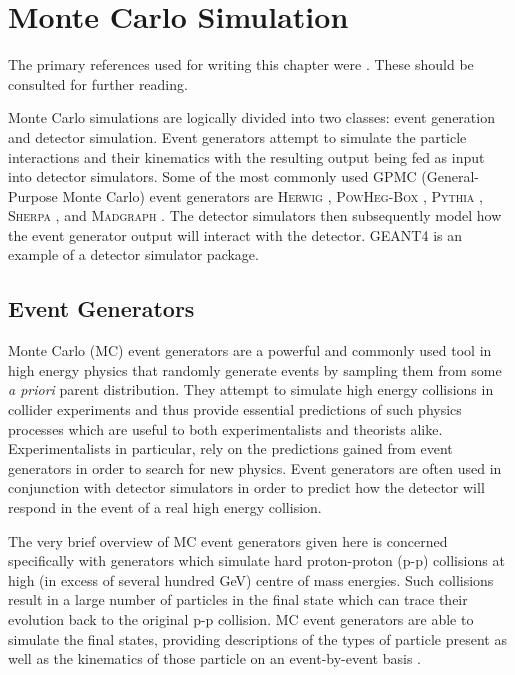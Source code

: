 \chapter{Monte Carlo Simulation}
The primary references used for writing this chapter were \cite{MC_ref1,MC_ref2,MC_ref3,schnoor_thesis,Seymour}. These should be consulted for further reading.

Monte Carlo simulations are logically divided into two classes: event generation and detector simulation. Event generators attempt to simulate the particle interactions and their kinematics with the resulting output being fed as input into detector simulators. Some of the most commonly used GPMC (General-Purpose Monte Carlo) event generators are \textsc{Herwig} \cite{Herwig}, \textsc{PowHeg-Box} \cite{Powheg}, \textsc{Pythia} \cite{Pythia}, \textsc{Sherpa} \cite{Sherpa}, and \textsc{Madgraph} \cite{Madgraph}. The detector simulators then subsequently model how the event generator output will interact with the detector. \textsc{GEANT4} \cite {GEANT} is an example of a detector simulator package.
\section{Event Generators}
\label{event_generators}
Monte Carlo (MC) event generators are a powerful and commonly used tool in high energy physics that randomly generate events by sampling them from some \emph{a priori} parent distribution. They attempt to simulate high energy collisions in collider experiments and thus provide essential predictions of such physics processes which are useful to both experimentalists and theorists alike. Experimentalists in particular, rely on the predictions gained from event generators in order to search for new physics. Event generators are often used in conjunction with detector simulators in order to predict how the detector will respond in the event of a real high energy collision. 

The very brief overview of MC event generators given here is concerned specifically with generators which simulate hard proton-proton (p-p) collisions at high (in excess of several hundred GeV) centre of mass energies. Such collisions result in a large number of particles in the final state which can trace their evolution back to the original p-p collision. MC event generators are able to simulate the final states, providing descriptions of the types of particle present as well as the kinematics of those particle on an event-by-event basis \cite{MC2}.

